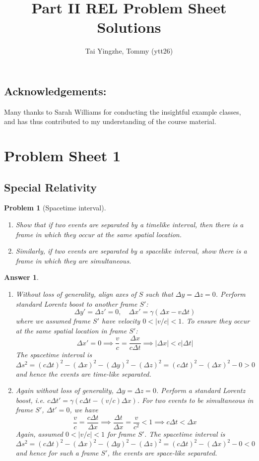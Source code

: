 \documentclass[a4paper]{article}
\title{\textbf{Part II REL Problem Sheet Solutions}}
\author{Tai Yingzhe, Tommy (ytt26)}
\date{}
\theoremstyle{new2}
\newtheorem{ans}{Answer}[section]
\theoremstyle{new}
\newtheorem{qns}{Problem}[section]
\begin{document}
\maketitle
\tableofcontents
\subsection*{Acknowledgements:}
Many thanks to Sarah Williams for conducting the insightful example classes, and has thus contributed to my understanding of the course material.
\newpage
\section{Problem Sheet 1}
\subsection*{Special Relativity}
\begin{qns}[Spacetime interval]\leavevmode
\begin{enumerate}[label=(\alph*)]
\item Show that if two events are separated by a timelike interval, then there is a frame in which they occur at the same spatial location.
\item Similarly, if two events are separated by a spacelike interval, show there is a frame in which they are simultaneous.
\end{enumerate}
\end{qns}
\begin{ans}\leavevmode
\begin{enumerate}[label=(\alph*)]
\item Without loss of generality, align axes of $S$ such that $\Delta y=\Delta z=0$. Perform standard Lorentz boost to another frame $S'$:
$$\Delta y'=\Delta z'=0,\quad\Delta x'=\gamma(\Delta x-v\Delta t)$$
where we assumed frame $S'$ have velocity $0<|v/c|<1$. To ensure they occur at the same spatial location in frame $S'$:
$$\Delta x'=0\implies\frac{v}{c}=\frac{\Delta x}{c\Delta t}\implies|\Delta x|<c|\Delta t|$$
The spacetime interval is
$$\Delta s^2=(c\Delta t)^2-(\Delta x)^2-(\Delta y)^2-(\Delta z)^2=(c\Delta t)^2-(\Delta x)^2-0>0$$
and hence the events are time-like separated.
\item Again without loss of generality, $\Delta y=\Delta z=0$. Perform a standard Lorentz boost, i.e. $c\Delta t'=\gamma(c\Delta t-(v/c)\Delta x)$. For two events to be simultaneous in frame $S'$, $\Delta t'=0$, we have $$\frac{v}{c}=\frac{c\Delta t}{\Delta x}\implies\frac{\Delta t}{\Delta x}=\frac{v}{c^2}<1\implies c\Delta t<\Delta x$$
Again, assumed $0<|v/c|<1$ for frame $S'$. The spacetime interval is
$$\Delta s^2=(c\Delta t)^2-(\Delta x)^2-(\Delta y)^2-(\Delta z)^2=(c\Delta t)^2-(\Delta x)^2-0<0$$
and hence for such a frame $S'$, the events are space-like separated.
\end{enumerate}
\end{ans}
\end{document}
